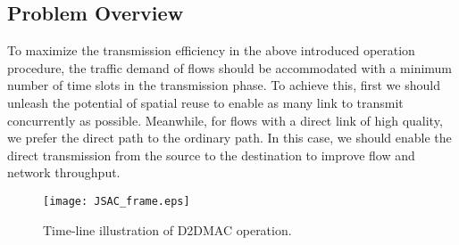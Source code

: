 \documentclass[journal]{IEEEtran}
\begin{document}
\subsection{Problem Overview}\label{S3-2}

To maximize the transmission efficiency in the above introduced operation procedure, the traffic
demand of flows should be accommodated with a minimum number of time slots in the transmission
phase. To achieve this, first we should unleash the potential of spatial reuse to enable as many
link to transmit concurrently as possible. Meanwhile, for flows with a direct link of high quality,
we prefer the direct path to the ordinary path. In this case, we should enable the direct
transmission from the source to the destination to improve flow and network throughput.



\begin{figure} [htbp] \begin{center}
\texttt{[image: JSAC\_frame.eps]}
\end{center}
\caption{Time-line illustration of D2DMAC operation.} \label{frame}
\end{figure}
\end{document}
